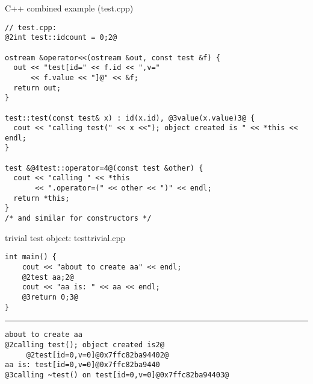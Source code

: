 \begin{frame}[fragile,label=overEx2]{C++ combined example (test.cpp)}
\begin{lstlisting}
// test.cpp:
@2int test::idcount = 0;2@

ostream &operator<<(ostream &out, const test &f) {
  out << "test[id=" << f.id << ",v="
      << f.value << "]@" << &f;
  return out;
}

test::test(const test& x) : id(x.id), @3value(x.value)3@ {
  cout << "calling test(" << x <<"); object created is " << *this << endl;
}

test &@4test::operator=4@(const test &other) {
  cout << "calling " << *this
       << ".operator=(" << other << ")" << endl;
  return *this;
}
/* and similar for constructors */
\end{lstlisting}
\end{frame}


\begin{frame}[fragile,label=testtrivial]{trivial test object: testtrivial.cpp}
\begin{lstlisting}
int main() {
    cout << "about to create aa" << endl;
    @2test aa;2@
    cout << "aa is: " << aa << endl;
    @3return 0;3@
}
\end{lstlisting}
\hrule
\begin{lstlisting}
about to create aa
@2calling test(); object created is2@
     @2test[id=0,v=0]@0x7ffc82ba94402@
aa is: test[id=0,v=0]@0x7ffc82ba9440
@3calling ~test() on test[id=0,v=0]@0x7ffc82ba94403@
\end{lstlisting}
\end{frame}

